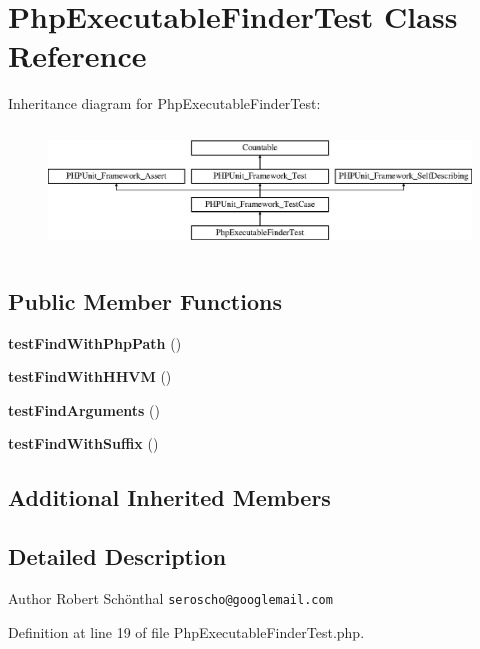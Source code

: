 \section{Php\+Executable\+Finder\+Test Class Reference}
\label{class_symfony_1_1_component_1_1_process_1_1_tests_1_1_php_executable_finder_test}
Inheritance diagram for Php\+Executable\+Finder\+Test\+:\begin{figure}[H]
\begin{center}
\leavevmode
\includegraphics[height=3.303835cm]{class_symfony_1_1_component_1_1_process_1_1_tests_1_1_php_executable_finder_test}
\end{center}
\end{figure}
\subsection*{Public Member Functions}
\begin{DoxyCompactItemize}
\item 
{\bf test\+Find\+With\+Php\+Path} ()
\item 
{\bf test\+Find\+With\+H\+H\+V\+M} ()
\item 
{\bf test\+Find\+Arguments} ()
\item 
{\bf test\+Find\+With\+Suffix} ()
\end{DoxyCompactItemize}
\subsection*{Additional Inherited Members}


\subsection{Detailed Description}
\begin{DoxyAuthor}{Author}
Robert Schönthal {\tt seroscho@googlemail.\+com} 
\end{DoxyAuthor}


Definition at line 19 of file Php\+Executable\+Finder\+Test.\+php.



